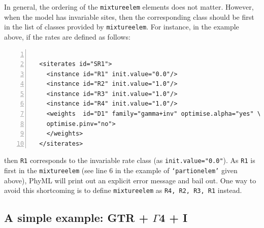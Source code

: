 \documentclass[a4paper,12pt]{article}
\newcommand{\x}[1]{\texttt{#1}}
\begin{document}
In general, the  ordering of the \x{mixtureelem}  elements does not matter. However,  when the model
has invariable sites, then  the corresponding class should be first in  the list of classes provided
by \x{mixtureelem}. For instance, in the example above, if the rates are defined as follows:

\vspace{0.2cm}
\begin{Verbatim}[frame=single, label=Example of `siterates' component, samepage=true,
  baselinestretch=0.5, fontsize=\small, numbers=left]

  <siterates id="SR1">
    <instance id="R1" init.value="0.0"/>
    <instance id="R2" init.value="1.0"/>
    <instance id="R3" init.value="1.0"/>
    <instance id="R4" init.value="1.0"/>
    <weights  id="D1" family="gamma+inv" optimise.alpha="yes" \
    optimise.pinv="no">
    </weights>
  </siterates>
\end{Verbatim}

then \x{R1} corresponds to the invariable  rate class (as \x{init.value="0.0"}).  As \x{R1} is first
in the  \x{mixtureelem} (see line  6 in  the example of  \x{`partionelem'} given above),  PhyML will
print out an  explicit error message and bail out.   One way to avoid this  shortcoming is to define
\x{mixtureelem} as \x{R4, R2, R3, R1} instead.


\subsection{A simple example: GTR + $\Gamma$4 + I}
\end{document}
